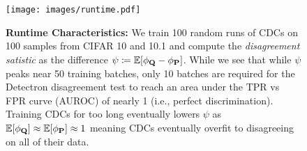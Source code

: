 \begin{figure}[!htb]
    \centering
    \hspace*{2mm}\texttt{[image: images/runtime.pdf]}
    \caption{\small \textbf{Runtime Characteristics:} We train 100 random runs of CDCs on 100 samples from CIFAR 10 and 10.1 and compute the \textit{disagreement satistic} as the difference $\psi\coloneqq \mathbb{E}[\phi_{\mathbf{Q}} - \phi_{\mathbf{P}}]$.
    While we see that while $\psi$ peaks near 50 training batches, only 10 batches are required for the Detectron disagreement test to reach an area under the TPR vs FPR curve (AUROC) of nearly 1 (i.e., perfect discrimination).
    Training CDCs for too long eventually lowers $\psi$ as $\mathbb{E}[\phi_{\mathbf{Q}}] \approx \mathbb{E}[\phi_{\mathbf{P}}]\approx 1$ meaning CDCs eventually overfit to disagreeing on all of their data.}
    \label{fig:runtime}
\end{figure}